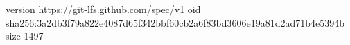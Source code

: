 version https://git-lfs.github.com/spec/v1
oid sha256:3a2db3f79a822e4087d65f342bbf60cb2a6f83bd3606e19a81d2ad71b4e5394b
size 1497
